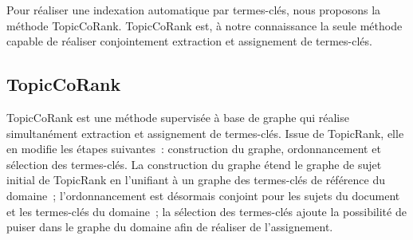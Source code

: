     Pour réaliser une indexation automatique par termes-clés, nous proposons la
    méthode TopicCoRank. TopicCoRank est, à notre connaissance la seule méthode
    capable de réaliser conjointement extraction et assignement de termes-clés.

    \subsection{TopicCoRank}
    \label{subsec:main-domain_specific_keyphrase_annotation-supervised_automatic_keyphrase_annotation-topiccorank}
      TopicCoRank est une méthode supervisée à base de graphe qui réalise
      simultanément extraction et assignement de termes-clés. Issue de
      TopicRank, elle en modifie les étapes suivantes~: construction du graphe,
      ordonnancement et sélection des termes-clés. La construction du graphe
      étend le graphe de sujet initial de TopicRank en l'unifiant à un graphe
      des termes-clés de référence du domaine~; l'ordonnancement est désormais
      conjoint pour les sujets du document et les termes-clés du domaine~; la
      sélection des termes-clés ajoute la possibilité de puiser dans le graphe
      du domaine afin de réaliser de l'assignement.


